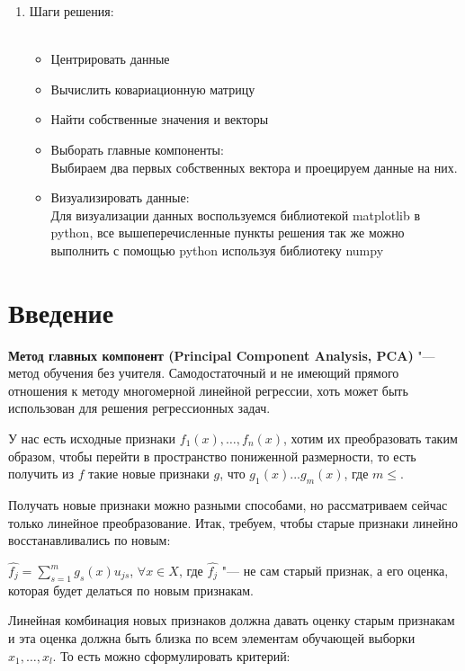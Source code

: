 \begin{enumerate}
   \item Шаги решения:\\\
   \begin{itemize} 
       \item Центрировать данные \\
       \item Вычислить ковариационную матрицу \\
       \item Найти собственные значения и векторы \\ 
       \item Выборать главные компоненты: \\
        Выбираем два первых собственных вектора и проецируем данные на них.
       \item Визуализировать данные: \\
       Для визуализации данных воспользуемся библиотекой matplotlib в python, все вышеперечисленные пункты решения так же можно выполнить с помощью python используя библиотеку numpy       
   \end{itemize}
\end{enumerate}

\section{Введение}

\indent\textbf{Метод главных компонент  (Principal Component Analysis, PCA)} "--- метод обучения без учителя. Самодостаточный и не имеющий прямого отношения к методу многомерной линейной регрессии, хоть  может быть использован для решения регрессионных задач.

У нас есть исходные признаки $f_{1}(x), \dotsc, f_{n}(x)$, хотим их преобразовать таким образом, чтобы перейти в пространство пониженной размерности, то есть получить из $f$ такие новые признаки $g$, что $g_{1}(x)...g_{m}(x)$, где $m\leq$.

Получать новые признаки можно разными способами, но рассматриваем сейчас только линейное преобразование. Итак, требуем, чтобы старые признаки линейно восстанавливались по новым:\par
$\hat{f_j} = \displaystyle\sum_{s=1}^{m} g_s(x)u_{js}$, $\forall x \in X$, где $\hat{f_j}$ "--- не сам старый признак, а его оценка, которая будет делаться по новым признакам. \par Линейная комбинация новых признаков должна давать оценку старым признакам и эта оценка должна быть близка по всем элементам обучающей выборки $x_1, \dotsc, x_l$. То есть можно сформулировать критерий:\par

